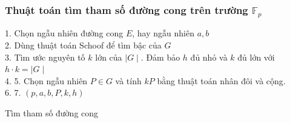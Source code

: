 \documentclass [xcolor=svgnames, t] {beamer}
\theoremstyle{definition}
\begin{document}
\begin{frame}
    \fontsize{10pt}{12pt}
    \selectfont
    \frametitle{Thuật toán tìm tham số đường cong trên trường $\mathbb{F}_p$}

    \begin{algorithm}[H]
        \Begin
        {
            1. Chọn ngẫu nhiên đường cong $E$, hay ngẫu nhiên $a,b$  \\
            2. Dùng thuật toán Schoof để tìm bậc của $G$ \\
            3. Tìm ước nguyên tố $k$ lớn của $\mid G \mid$. Đảm bảo $h$ đủ nhỏ và $k$ đủ lớn với $h \cdot k = \mid G \mid$ \\
            4. 
            5. Chọn ngẫu nhiên $P \in G$ và tính $kP$ bằng thuật toán nhân đôi và cộng. \\
            6. 
            7. \Return $(p, a, b, P, k, h)$
        }
        \caption{Tìm tham số đường cong}
    \end{algorithm}

\end{frame}
\end{document}
